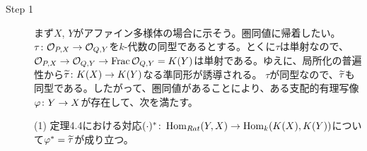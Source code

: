 \begin{comment}
\bfsubsection{例 4.9.1}
\barquo{
ここで$\P^1$は開集合$t \neq 0$と$u \neq 0$で覆われるので、別々に考える。
}
\begin{rem}
このあと、開集合$u \neq 0$の場合が考察されることはついになかった…。いったいどういうつもりなのか。
\end{rem}
\end{comment}


\begin{description}
\item[Step 1] まず$X$, $Y$がアファイン多様体の場合に示そう。圏同値に帰着したい。$\tau \colon \mathcal{O}_{P,X} \to \mathcal{O}_{Q,Y}$を$k$-代数の同型であるとする。とくに$\tau$は単射なので、$\mathcal{O}_{P,X} \to \mathcal{O}_{Q,Y} \to \operatorname{Frac} \mathcal{O}_{Q,Y} = K(Y)$は単射である。ゆえに、局所化の普遍性から$\widetilde{\tau} \colon K(X) \to K(Y)$なる準同形が誘導される。
  $\tau$が同型なので、$\widetilde{\tau}$も同型である。したがって、圏同値があることにより、ある支配的有理写像${\varphi} \colon Y \to X$が存在して、次を満たす。

  (1) 定理4.4における対応$( \cdot )^* \colon \operatorname{Hom}_{Rat}(Y,X) \to \operatorname{Hom}_k(K(X),K(Y))$について${\varphi}^* = \widetilde{\tau}$が成り立つ。


\end{description}
